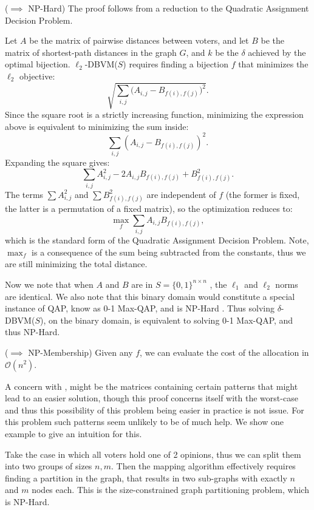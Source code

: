 \begin{proofc}{}
	($\implies$ NP-Hard) The proof follows from a reduction to the Quadratic Assignment Decision Problem.

	Let $A$ be the matrix of pairwise distances between voters, and let $B$ be the matrix of shortest-path distances in the graph $G$, and $k$ be the $\delta$ achieved by the optimal bijection. $\ell_2$-DBVM($S$) requires finding a bijection $f$ that minimizes the $\ell_2$ objective:
	$$
		\sqrt{\sum_{i,j} \bigl(A_{i,j} - B_{f(i),f(j)}\bigr)^2}.
	$$
	Since the square root is a strictly increasing function, minimizing the expression above is equivalent to minimizing the sum inside:
	$$
		\sum_{i,j} (A_{i,j} - B_{f(i),f(j)})^2.
	$$
	Expanding the square gives:
	$$
		\sum_{i,j} A_{i,j}^2 - 2 A_{i,j} B_{f(i),f(j)} + B_{f(i),f(j)}^2.
	$$
	The terms $\sum A_{i,j}^2$ and $\sum B_{f(i),f(j)}^2$ are independent of $f$ (the former is fixed, the latter is a permutation of a fixed matrix), so the optimization reduces to:
	$$
		\max_f \sum_{i,j} A_{i,j} B_{f(i),f(j)},
	$$
	which is the standard form of the Quadratic Assignment Decision Problem. Note, $\max_f$ is a consequence of the sum being subtracted from the constants, thus we are still minimizing the total distance.

	Now we note that when $A$ and $B$ are in $S= \{0,1\}^{n \times n}$ , the
	$\ell_1$ and $\ell_2$ norms are identical. We also note that this binary
	domain would constitute a special instance of QAP, know as 0-1 Max-QAP, and
	is NP-Hard \cite{nagarajanMaximumQuadraticAssignment2009}. Thus solving
	$\delta$-DBVM($S$), on the binary domain, is equivalent to solving 0-1
	Max-QAP, and thus NP-Hard.~\checkmark


	($\implies$ NP-Membership) Given any $f$, we can evaluate the cost of the allocation in $\mathcal{O}(n^2)$.~\checkmark


\end{proofc}

A concern with , might be the matrices
containing certain patterns that might lead to an easier solution, though this
proof concerns itself with the worst-case and thus this possibility of this
problem being easier in practice is not issue. For this problem such patterns
seem unlikely to be of much help. We show one example to give an intuition for
this.

Take the case in which all voters hold one of 2 opinions, thus we can split
them into two groups of sizes $n, m$. Then the mapping algorithm
effectively requires finding a partition in the graph, that results in two
sub-graphs with exactly $n$ and $m$ nodes each. This is the
size-constrained graph partitioning problem, which is NP-Hard.

